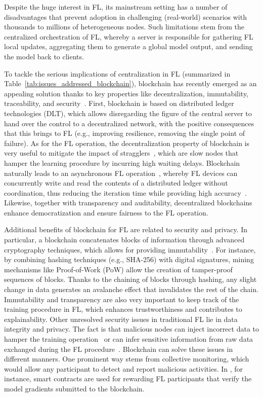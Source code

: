 \documentclass[lettersize,journal]{IEEEtran}
\begin{document}
Despite the huge interest in FL, its mainstream setting has a number of disadvantages that prevent adoption in challenging (real-world) scenarios with thousands to millions of heterogeneous nodes. Such limitations stem from the centralized orchestration of FL, whereby a server is responsible for gathering FL local updates, aggregating them to generate a global model output, and sending the model back to clients.

To tackle the serious implications of centralization in FL (summarized in Table~\ref{tab:issues_addressed_blockchain}), blockchain has recently emerged as an appealing solution thanks to key properties like decentralization, immutability, traceability, and security~\cite{nakamoto2008bitcoin}. First, blockchain is based on distributed ledger technologies (DLT), which allows disregarding the figure of the central server to hand over the control to a decentralized network, with the positive consequences that this brings to FL (e.g., improving resilience, removing the single point of failure). As for the FL operation, the decentralization property of blockchain is very useful to mitigate the impact of stragglers~\cite{li2020federated2}, which are slow nodes that hamper the learning procedure by incurring high waiting delays. Blockchain naturally leads to an asynchronous FL operation~\cite{sprague2018asynchronous}, whereby FL devices can concurrently write and read the contents of a distributed ledger without coordination, thus reducing the iteration time while providing high accuracy~\cite{feyzmahdavian2016asynchronous, xu2021bafl}. Likewise, together with transparency and auditability, decentralized blockchains enhance democratization and ensure fairness to the FL operation.

Additional benefits of blockchain for FL are related to security and privacy. In particular, a blockchain concatenates blocks of information through advanced cryptography techniques, which allows for providing immutability~\cite{nguyen2021bedgehealth}. For instance, by combining hashing techniques (e.g., SHA-256) with digital signatures, mining mechanisms like Proof-of-Work (PoW) allow the creation of tamper-proof sequences of blocks. Thanks to the chaining of blocks through hashing, any slight change in data generates an avalanche effect that invalidates the rest of the chain. Immutability and transparency are also very important to keep track of the training procedure in FL, which enhances trustworthiness and contributes to explainability. Other unresolved security issues in traditional FL lie in data integrity and privacy. The fact is that malicious nodes can inject incorrect data to hamper the training operation~\cite{fang2020local} or can infer sensitive information from raw data exchanged during the FL procedure~\cite{mothukuri2021survey}. Blockchain can solve these issues in different manners. One prominent way stems from collective monitoring, which would allow any participant to detect and report malicious activities. In \cite{nguyen2019blockchain}, for instance, smart contracts are used for rewarding FL participants that verify the model gradients submitted to the blockchain.
\end{document}
